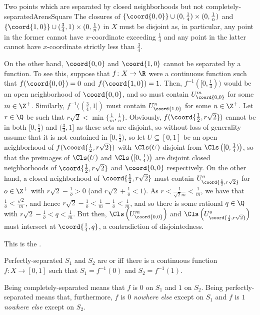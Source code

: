 \begin{exm}{Two points which are separated by closed neighborhoods but not completely-separated}{ArensSquare}
The closures of $\{ \coord{0,0}\} \cup (0,\frac{1}{4})\times (0,\frac{1}{n})$ and $\{ \coord{1,0}\} \cup (\frac{3}{4},1)\times (0,\frac{1}{n})$ in $X$ must be disjoint as, in particular, any point in the former cannot have $x$-coordinate exceeding $\frac{1}{4}$ and any point in the latter cannot have $x$-coordinate strictly less than $\frac{3}{4}$.

On the other hand, $\coord{0,0}$ and $\coord{1,0}$ cannot be separated by a function.  To see this, suppose that $f\colon X\rightarrow \R$ were a continuous function such that $f(\coord{0,0})=0$ and $f(\coord{1,0})=1$.  Then, $f^{-1}([0,\frac{1}{4}))$ would be an open neighborhood of $\coord{0,0}$, and so must contain $U_{\coord{0,0}}^m$ for some $m\in \Z ^+$.  Similarly, $f^{-1}((\frac{3}{4},1])$ must contain $U_{\coord{1,0}}^n$ for some $n\in \Z ^+$.  Let $r\in \Q$ be such that $r\sqrt{2}<\min \{ \frac{1}{m},\frac{1}{n}\}$.  Obviously, $f(\coord{\frac{1}{2},r\sqrt{2}})$ cannot be in both $[0,\frac{1}{4})$ and $(\frac{3}{4},1]$ as these sets are disjoint, so without loss of generality assume that it is not contained in $[0,\frac{1}{4})$, so let $U \subseteq [0,1]$ be an open neighborhood of $f(\coord{\frac{1}{2},r\sqrt{2}})$ with $\Cls (U)$ disjoint from $\Cls \left( [0,\frac{1}{4})\right) $, so that the preimages of $\Cls (U)$ and $\Cls \left( [0,\frac{1}{4})\right)$ are disjoint closed neighborhoods of $\coord{\frac{1}{2},r\sqrt{2}}$ and $\coord{0,0}$ respectively.  On the other hand, a closed neighborhood of $\coord{\frac{1}{2},r\sqrt{2}}$ must contain $U_{\coord{\frac{1}{2},r\sqrt{2}}}^o$ for $o\in \Z ^+$ with $r\sqrt{2}-\frac{1}{o}>0$ (and $r\sqrt{2}+\frac{1}{o}<1$).  As $r<\frac{1}{\sqrt{2}m}<\frac{1}{m}$, we have that $\frac{1}{o}<\frac{\sqrt{2}}{m}$, and hence $r\sqrt{2}-\frac{1}{o}<\frac{1}{m}-\frac{1}{o}<\frac{1}{m}$, and so there is some rational $q\in \Q$ with $r\sqrt{2}-\frac{1}{o}<q<\frac{1}{m}$.  But then, $\Cls \left( U_{\coord{0,0}}^m\right)$ and $\Cls \left( U_{\coord{\frac{1}{2},r\sqrt{2}}}^o\right)$ must intersect at $\coord{\frac{1}{4},q}$,  a contradiction of disjointedness.
\begin{rmk}
This is the .
\end{rmk}
\end{exm}
\begin{dfn}{Perfectly-separated}{}
$S_1$ and $S_2$ are  or  iff there is a continuous function $f\colon X\rightarrow [0,1]$ such that $S_1=f^{-1}(0)$ and $S_2=f^{-1}(1)$.
\begin{rmk}
Being completely-separated means that $f$ is $0$ on $S_1$ and $1$ on $S_2$.  Being perfectly-separated means that, furthermore, $f$ is $0$ \emph{nowhere else} except on $S_1$ and $f$ is $1$ \emph{nowhere else} except on $S_2$.
\end{rmk}
\end{dfn}
